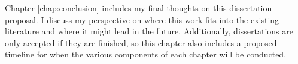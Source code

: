 

Chapter \ref{chap:conclusion} includes my final thoughts on this dissertation proposal. 
I discuss my perspective on where this work fits into the existing literature and where it might lead in the future.
Additionally, dissertations are only accepted if they are finished, %
so this chapter also includes a proposed timeline for when the various components of each chapter will be conducted.

